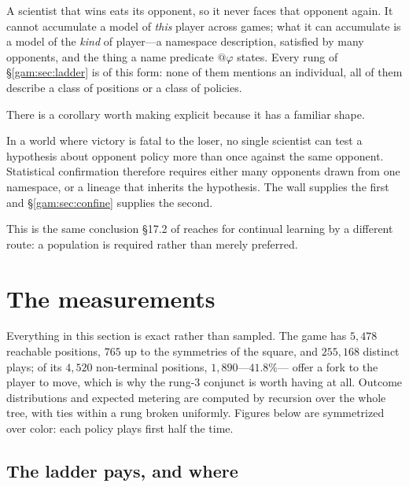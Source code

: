A scientist that wins eats its opponent, so it never faces that opponent again.
It cannot accumulate a model of \emph{this} player across games; what it can
accumulate is a model of the \emph{kind} of player---a namespace description,
satisfied by many opponents, and the thing a name predicate $@\varphi$ states.
Every rung of \S\ref{gam:sec:ladder} is of this form: none of them mentions an
individual, all of them describe a class of positions or a class of policies.

There is a corollary worth making explicit because it has a familiar shape.

\begin{proposition}\label{gam:learning-requires-population}
In a world where victory is fatal to the loser, no single scientist can test a
hypothesis about opponent policy more than once against the same opponent.
Statistical confirmation therefore requires either many opponents drawn from one
namespace, or a lineage that inherits the hypothesis. The wall supplies the
first and \S\ref{gam:sec:confine} supplies the second.
\end{proposition}

This is the same conclusion \S17.2 of \chSci reaches for continual
learning by a different route: a population is required rather than merely
preferred.

\section{The measurements}\label{gam:sec:measure}\label{gam:S8}

Everything in this section is exact rather than sampled. The game has $5{,}478$
reachable positions, $765$ up to the symmetries of the square, and $255{,}168$
distinct plays; of its $4{,}520$ non-terminal positions, $1{,}890$---$41.8\%$---
offer a fork to the player to move, which is why the rung-3 conjunct is worth
having at all. Outcome distributions and expected metering are computed by
recursion over the whole tree, with ties within a rung broken uniformly.
Figures below are symmetrized over color: each policy plays first half the
time.

\subsection{The ladder pays, and where}\label{gam:S8.1}

